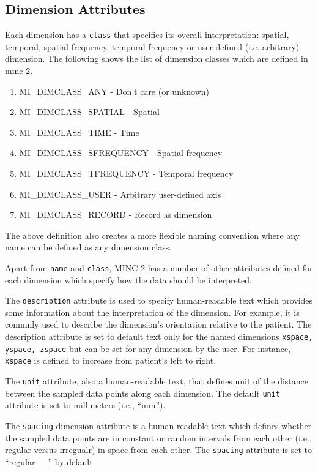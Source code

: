 \documentclass{article}
\begin{document}
\subsection{Dimension Attributes}
Each dimension has a {\tt class} that specifies its overall interpretation: spatial, 
temporal, spatial frequency, temporal frequency or user-defined (i.e. arbitrary) dimension.
The following shows the list of dimension classes which are defined in minc 2.
\begin{enumerate}
\item MI\_DIMCLASS\_ANY        - Don't care (or unknown)
\item MI\_DIMCLASS\_SPATIAL    - Spatial
\item MI\_DIMCLASS\_TIME       - Time
\item MI\_DIMCLASS\_SFREQUENCY - Spatial frequency
\item MI\_DIMCLASS\_TFREQUENCY - Temporal frequency
\item MI\_DIMCLASS\_USER       - Arbitrary user-defined axis
\item MI\_DIMCLASS\_RECORD     - Record as dimension
\end{enumerate}

The above definition also creates a more flexible naming convention where any name 
can be defined as any dimension class.

Apart from {\tt name} and {\tt class}, MINC 2 has a number of other attributes defined for 
each dimension which specify how the data should be interpreted. 

The {\tt description} attribute is used to specify human-readable text which provides
some information about the interpretation of the dimension. For example, it is commnly 
used to describe the dimension's orientation relative to the patient.
The description attribute is set to default text only for the named dimensions
{\tt xspace, yspace, zspace} but can be set for any dimension by the user. For instance,
{\tt xspace} is defined to increase from patient's left to right.

The {\tt unit} attribute, also a human-readable text, that defines unit of the distance
between the sampled data points along each dimension. The default {\tt unit} attribute is set
to millimeters (i.e., ``mm'').

The {\tt spacing} dimension attribute is a human-readable text which defines whether
the sampled data points are in constant or random intervals from each other
(i.e., regular versus irregualr) in space from each other. The {\tt spacing} attribute
is set to ``regular\_\_'' by default.
\end{document}
